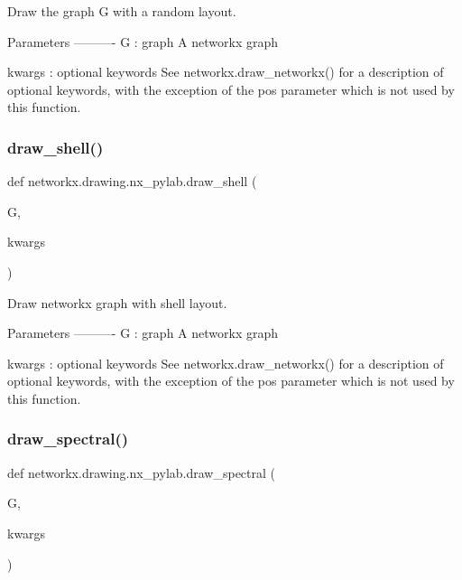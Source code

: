 \begin{DoxyVerb}Draw the graph G with a random layout.

Parameters
----------
G : graph
    A networkx graph

kwargs : optional keywords
    See networkx.draw_networkx() for a description of optional keywords,
    with the exception of the pos parameter which is not used by this
    function.
\end{DoxyVerb}
 \mbox{\label{namespacenetworkx_1_1drawing_1_1nx__pylab_ae93adbb59f973371b6639edbdb997253}} 
\subsubsection{\texorpdfstring{draw\+\_\+shell()}{draw\_shell()}}
{\footnotesize\ttfamily def networkx.\+drawing.\+nx\+\_\+pylab.\+draw\+\_\+shell (\begin{DoxyParamCaption}\item[{}]{G,  }\item[{}]{kwargs }\end{DoxyParamCaption})}

\begin{DoxyVerb}Draw networkx graph with shell layout.

Parameters
----------
G : graph
    A networkx graph

kwargs : optional keywords
    See networkx.draw_networkx() for a description of optional keywords,
    with the exception of the pos parameter which is not used by this
    function.
\end{DoxyVerb}
 \mbox{\label{namespacenetworkx_1_1drawing_1_1nx__pylab_a2641bdfab26d56a434e2ccd8f403bfaa}} 
\subsubsection{\texorpdfstring{draw\+\_\+spectral()}{draw\_spectral()}}
{\footnotesize\ttfamily def networkx.\+drawing.\+nx\+\_\+pylab.\+draw\+\_\+spectral (\begin{DoxyParamCaption}\item[{}]{G,  }\item[{}]{kwargs }\end{DoxyParamCaption})}

